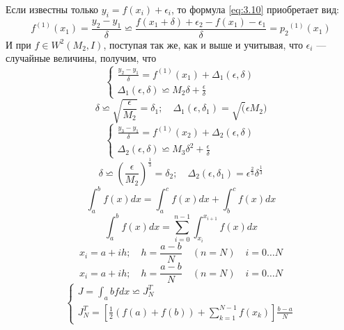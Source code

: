 Если известны только $y_i = f(x_i) + \epsilon_i$, то формула \ref{eq:3.10} приобретает вид:
\begin{dmath} \label{eq:3.10}
	f^{(1)}(x_1) = \frac{y_2 - y_1}{\delta} \backsimeq \frac{f(x_1 + \delta) + \epsilon_2 - f(x_1) - \epsilon_1}{\delta} = {p_2}^{(1)}(x_1)
\end{dmath}
И при $f \in W^2(M_2, I)$, поступая так же, как и выше и учитывая, что $\epsilon_i$ --- случайные величины, получим, что
\begin{dmath}
	\begin{cases}
		\frac{y_2 - y_1}{\delta} = f^{(1)}(x_1) + \Delta_1(\epsilon, \delta) \\
		\Delta_1(\epsilon, \delta) \backsimeq M_2\delta + \frac{\epsilon}{\delta}
	\end{cases}
\end{dmath}
\begin{equation}
	\delta \backsimeq \sqrt{\frac{\epsilon}{M_2}} = \delta_1; \quad \Delta_1(\epsilon, \delta_1) = \sqrt(\epsilon M_2)
\end{equation}
\begin{dmath}
	\begin{cases}
		\frac{y_3 - y_1}{\delta} = f^{(1)}(x_2) + \Delta_2(\epsilon, \delta) \\ 
		\Delta_2(\epsilon, \delta) \backsimeq M_3\delta^2 + \frac{\epsilon}{\delta}
	\end{cases}
\end{dmath}
\begin{equation}
	\delta \backsimeq {(\frac{\epsilon}{M_2})}^{\frac{1}{3}} = \delta_2; \quad \Delta_2(\epsilon, \delta_1) = \epsilon^{\frac{2}{3}} \delta^{\frac{1}{3}}
\end{equation}
\begin{equation}
	\int_{a}^{b} f(x)dx = \int_{a}^{c}f(x)dx + \int_{b}^{c}f(x)dx
\end{equation}
\begin{equation}
	\int_{a}^{b} f(x)dx = \sum_{i=0}^{n-1}\int_{x_i}^{x_{i+1}}f(x)dx
\end{equation}
\begin{equation}
	x_i = a + ih; \quad h = \frac{a-b}{N} \quad (n=N) \quad i=0 \dots N
\end{equation}
\begin{equation}
x_i = a + ih; \quad h = \frac{a-b}{N} \quad (n=N) \quad i=0 \dots N
\end{equation}
\begin{dmath}
	\begin{cases}
		J = \int_{a}{b}fdx \backsimeq J^T_N \\ 
		J^T_N = [\frac{1}{2}(f(a)+f(b)) + \sum_{k=1}^{N-1}f(x_k)]\frac{b-a}{N}
	\end{cases}
\end{dmath}
